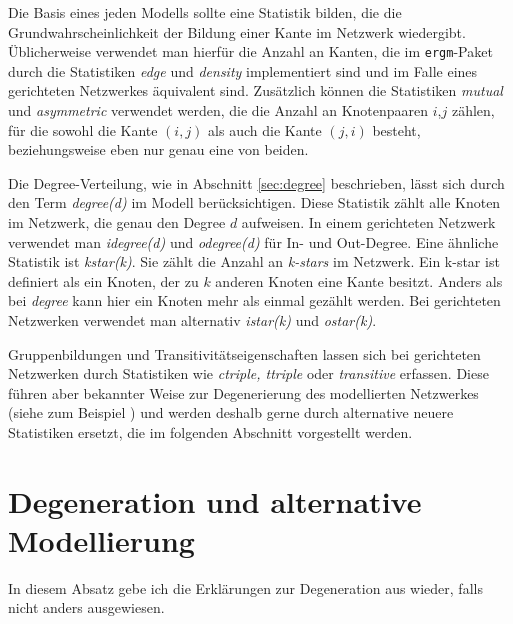 \documentclass[a4paper,ngerman,oneside,titlepage,bibliography=totoc,11pt]{scrreprt}
\begin{document}
Die Basis eines jeden Modells sollte eine Statistik bilden, die die Grundwahrscheinlichkeit der Bildung einer Kante im Netzwerk wiedergibt. Üblicherweise verwendet man hierfür die Anzahl an Kanten, die im \texttt{ergm}-Paket durch die Statistiken \textit{edge} und \textit{density} implementiert sind und im Falle eines gerichteten Netzwerkes äquivalent sind. Zusätzlich können die Statistiken \textit{mutual} und \textit{asymmetric} verwendet werden, die die Anzahl an Knotenpaaren $i$,$j$ zählen, für die sowohl die Kante $(i,j)$ als auch die Kante $(j,i)$ besteht, beziehungsweise eben nur genau eine von beiden.

Die Degree-Verteilung, wie in Abschnitt \ref{sec:degree} beschrieben, lässt sich durch den Term \textit{degree(d)} im Modell berücksichtigen. Diese Statistik zählt alle Knoten im Netzwerk, die genau den Degree $d$ aufweisen. In einem gerichteten Netzwerk verwendet man \textit{idegree(d)} und \textit{odegree(d)} für In- und Out-Degree. Eine ähnliche Statistik ist \textit{kstar(k)}. Sie zählt die Anzahl an \emph{k-stars} im Netzwerk. Ein k-star ist definiert als ein Knoten, der zu $k$ anderen Knoten eine Kante besitzt. Anders als bei \textit{degree} kann hier ein Knoten mehr als einmal gezählt werden. Bei gerichteten Netzwerken verwendet man alternativ \textit{istar(k)} und \textit{ostar(k)}.

Gruppenbildungen und Transitivitätseigenschaften lassen sich bei gerichteten Netzwerken durch Statistiken wie \textit{ctriple, ttriple} oder \textit{transitive} erfassen. Diese führen aber bekannter Weise zur Degenerierung des modellierten Netzwerkes (siehe zum Beispiel \citep{morris2008specification, hunter2008ergm, handcock2008statnet}) und werden deshalb gerne durch alternative neuere Statistiken ersetzt, die im folgenden Abschnitt vorgestellt werden.

\section{Degeneration und alternative Modellierung}
\label{sec:degeneration}
In diesem Absatz gebe ich die Erklärungen zur Degeneration aus \citet{handcock2008statnet} wieder, falls nicht anders ausgewiesen.
\end{document}
